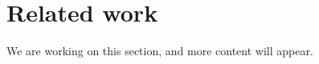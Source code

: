 

\section{Related work}
\begin{publictodo}We are working on this section, and more content will appear.\end{publictodo}



